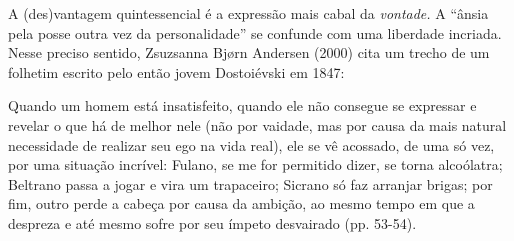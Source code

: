 A (des)vantagem quintessencial é a expressão mais cabal da
\emph{vontade.} A ``ânsia pela posse outra vez da personalidade'' se
confunde com uma liberdade incriada. Nesse preciso sentido, Zsuzsanna
Bjørn Andersen (2000) cita um trecho de um folhetim escrito pelo então
jovem Dostoiévski em 1847:

Quando um homem está insatisfeito, quando ele não consegue se expressar
e revelar o que há de melhor nele (não por vaidade, mas por causa da
mais natural necessidade de realizar seu ego na vida real), ele se vê
acossado, de uma só vez, por uma situação incrível: Fulano, se me for
permitido dizer, se torna alcoólatra; Beltrano passa a jogar e vira um
trapaceiro; Sicrano só faz arranjar brigas; por fim, outro perde a
cabeça por causa da ambição, ao mesmo tempo em que a despreza e até
mesmo sofre por seu ímpeto desvairado (pp. 53-54).

